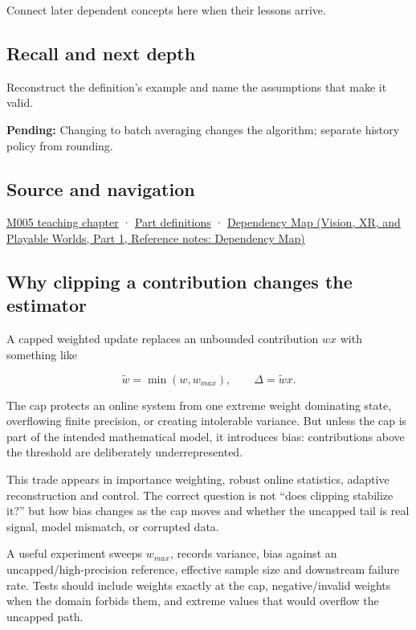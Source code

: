 \hypertarget{appendix-1e45d0613db3-used-by}{}

Connect later dependent concepts here when their lessons arrive.

\subsection{Recall and next depth}\label{appendix-1e45d0613db3-recall-and-next-depth}

\hypertarget{appendix-1e45d0613db3-recall-and-next-depth}{}

Reconstruct the definition's example and name the assumptions that make it valid.

\textbf{Pending:} Changing to batch averaging changes the algorithm; separate history policy from rounding.

\subsection{Source and navigation}\label{appendix-1e45d0613db3-source-and-navigation}

\hypertarget{appendix-1e45d0613db3-source-and-navigation}{}

\hyperref[01-foundations-i-ch001-when-arithmetic-meets-uncertainty]{M005 teaching chapter} · \hyperref[appendix-fd090d982a15-m005---parts-77-88]{Part definitions} · \href{../07-Vision-XR-and-Playable-Worlds-P01/main.pdf\#appendix-4ad47bdd269a}{Dependency Map (Vision, XR, and Playable Worlds, Part 1, Reference notes: Dependency Map)}

\subsection{Why clipping a contribution changes the estimator}\label{appendix-1e45d0613db3-why-clipping-a-contribution-changes-the-estimator}

\hypertarget{appendix-1e45d0613db3-why-clipping-a-contribution-changes-the-estimator}{}

A capped weighted update replaces an unbounded contribution \(w x\) with something like

\[
\tilde w = \min(w,w_{max}),
\qquad
\Delta = \tilde w x.
\]

The cap protects an online system from one extreme weight dominating state, overflowing finite precision, or creating intolerable variance. But unless the cap is part of the intended mathematical model, it introduces bias: contributions above the threshold are deliberately underrepresented.

This trade appears in importance weighting, robust online statistics, adaptive reconstruction and control. The correct question is not ``does clipping stabilize it?'' but how bias changes as the cap moves and whether the uncapped tail is real signal, model mismatch, or corrupted data.

A useful experiment sweeps \(w_{max}\), records variance, bias against an uncapped/high-precision reference, effective sample size and downstream failure rate. Tests should include weights exactly at the cap, negative/invalid weights when the domain forbids them, and extreme values that would overflow the uncapped path.
